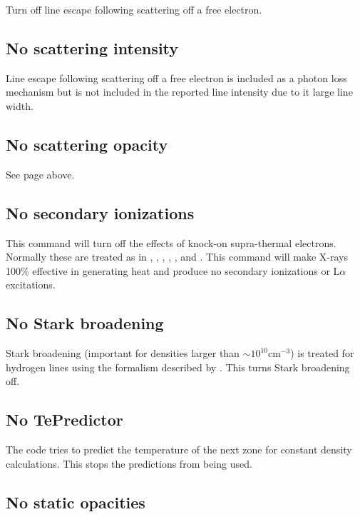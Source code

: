 Turn off line escape following scattering off a free electron.

\subsection{No scattering intensity}

Line escape following scattering off a free electron is included as a photon loss mechanism
but is not included in the reported line intensity due to it large line width.

\subsection{No scattering opacity}

See page \pageref{sec:CommandNoScatteringOpacity} above.

\subsection{No secondary ionizations}

This command will turn off the effects of knock-on supra-thermal
electrons.
Normally these are treated as in \citet{Spitzer1968},
\citet{Bergeron1971}, \citet{Shull1979}, \citet{Shull1985}, \citet{Xu1991},
and \citet{Dalgarno1999}.
This command
will make X-rays 100\% effective in generating heat and
produce no secondary
ionizations or L$\alpha $ excitations.

\subsection{No Stark broadening}

Stark broadening (important for densities larger than
$\sim 10^{10}\mathrm{cm}^{-3}$) is
treated for hydrogen lines using the formalism described by
\citet{Puetter1981}.
This turns Stark broadening off.

\subsection{No TePredictor}

The code tries to predict the temperature of the next zone for constant
density calculations.
This stops the predictions from being used.

\subsection{No static opacities}

